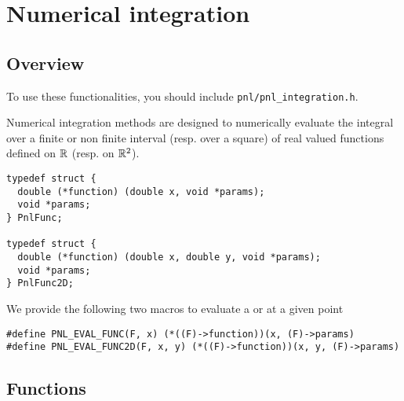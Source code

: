 \section{Numerical integration}
\subsection{Overview}

To use these functionalities, you should include \verb!pnl/pnl_integration.h!.

Numerical integration methods are designed to numerically evaluate the integral
over a finite or non finite interval (resp. over a square) of real valued
functions defined on ${\mathbb R}$ (resp. on ${\mathbb R}^2$).

\begin{lstlisting}
typedef struct {
  double (*function) (double x, void *params);
  void *params;
} PnlFunc;

typedef struct {
  double (*function) (double x, double y, void *params);
  void *params;
} PnlFunc2D;
\end{lstlisting}

We provide the following two macros to evaluate a  or
 at a given point
\begin{lstlisting}
#define PNL_EVAL_FUNC(F, x) (*((F)->function))(x, (F)->params)
#define PNL_EVAL_FUNC2D(F, x, y) (*((F)->function))(x, y, (F)->params)
\end{lstlisting}



\subsection{Functions}

